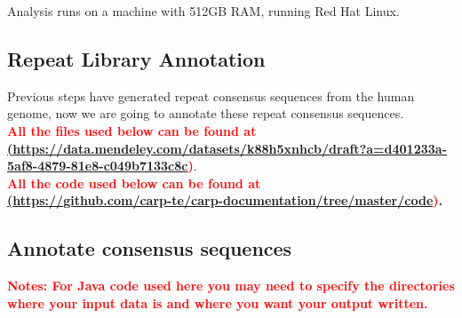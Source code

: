 \documentclass[a4paper,12pt]{article}
\begin{document}
	Analysis runs on a machine with 512GB RAM, running Red Hat Linux.
	
	\pagebreak
	
	\subsection{Repeat Library Annotation}
	Previous steps have generated repeat consensus sequences from the human genome, now we are going to annotate these repeat consensus sequences. \\
	\textbf{\textcolor{red}{All the files used below can be found at \\
			\href{<url>}(\url{https://data.mendeley.com/datasets/k88h5xnhcb/draft?a=d401233a-5af8-4879-81e8-c049b7133c8c})}}. \\
	\textbf{\textcolor{red}{All the code used below can be found at \\ \href{<url>}(\url{https://github.com/carp-te/carp-documentation/tree/master/code})}.} 
		
	\subsection{Annotate consensus sequences}
	\textbf{\textcolor{red}{Notes: For Java code used here you may need to specify the directories where your input data is and where you want your output written. }}
	
\end{document}
